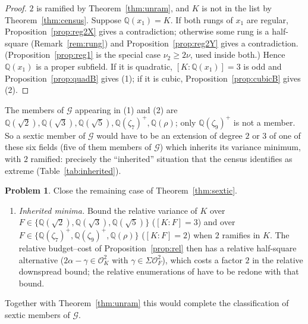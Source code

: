 \documentclass[11pt,reqno]{amsart}
\theoremstyle{plain}
\theoremstyle{definition}
\newtheorem{problem}[theorem]{Problem}
\newcommand{\Q}{\mathbb{Q}}
\newcommand{\OK}{\mathcal{O}_K}
\newcommand{\OF}{\mathcal{O}_F}
\newcommand{\Gcl}{\mathcal{G}}
\begin{document}
\begin{proof}
$2$ is ramified by Theorem~\ref{thm:unram}, and $K$ is not in the list by Theorem~\ref{thm:census}.
Suppose $\Q(x_1)=K$. If both rungs of $x_1$ are regular, Proposition~\ref{prop:reg2X} gives a
contradiction; otherwise some rung is a half-square (Remark~\ref{rem:rung}) and
Proposition~\ref{prop:reg2Y} gives a contradiction. (Proposition~\ref{prop:reg1} is the special case
$\nu_2\ge2\nu$, used inside both.) Hence $\Q(x_1)$ is a proper subfield. If it is quadratic,
$[K:\Q(x_1)]=3$ is odd and Proposition~\ref{prop:quadB} gives (1); if it is cubic,
Proposition~\ref{prop:cubicB} gives (2).
\end{proof}

The members of $\Gcl$ appearing in (1) and (2) are $\Q(\sqrt2),\Q(\sqrt3),\Q(\sqrt5),\Q(\zeta_7)^{+},
\Q(\rho)$; only $\Q(\zeta_9)^{+}$ is not a member. So a sextic member of $\Gcl$ would have to be an
extension of degree $2$ or $3$ of one of these six fields (five of them members of $\Gcl$) which
inherits its variance minimum, with $2$ ramified: precisely the ``inherited'' situation that the
census identifies as extreme (Table~\ref{tab:inherited}).

\begin{problem}\label{prob:sextic}
Close the remaining case of Theorem~\ref{thm:sextic}.
\begin{enumerate}
\item[] \emph{Inherited minima.} Bound the relative variance of $K$ over $F\in\{\Q(\sqrt2),\Q(\sqrt3),
\Q(\sqrt5)\}$ ($[K:F]=3$) and over $F\in\{\Q(\zeta_7)^{+},\Q(\zeta_9)^{+},\Q(\rho)\}$ ($[K:F]=2$) when $2$
ramifies in $K$. The relative budget--cost of Proposition~\ref{prop:rel} then has a relative half-square
alternative ($2\alpha-\gamma\in\OK^{2}$ with $\gamma\in\Sigma\OF^{2}$), which costs a factor $2$ in the
relative downspread bound; the relative enumerations of \cite{TwoO} have to be redone with that bound.
\end{enumerate}
Together with Theorem~\ref{thm:unram} this would complete the classification of sextic members of
$\Gcl$.
\end{problem}
\end{document}
